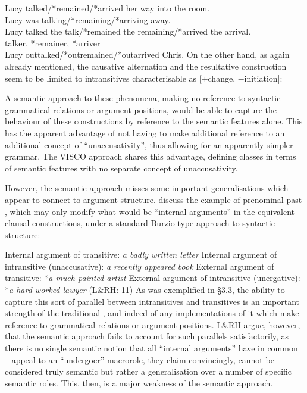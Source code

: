 \documentclass[output=paper]{langsci/langscibook}
\begin{document}
\ea
    \ea Lucy talked/*remained/*arrived her way into the room.\\
    \ex Lucy was talking/*remaining/*arriving away.\\
    \ex Lucy talked the talk/*remained the remaining/*arrived the arrival.\\
    \ex talker, *remainer, *arriver\\
    \ex Lucy outtalked/*outremained/*outarrived Chris.
    \z
\z
On the other hand, as again already mentioned, the causative alternation and
the resultative construction seem to be limited to intransitives
characterisable as [$+$change, $-$initiation]:

\ea
    \z
\z

\ea
    \z
\z
A semantic approach to these phenomena, making no reference to syntactic
grammatical relations or argument positions, would be able to capture the
behaviour of these constructions by reference to the semantic features alone.
This has the apparent advantage of not having to make additional reference to
an additional concept of \enquote{unaccusativity}, thus allowing for an
apparently simpler grammar. The VISCO approach shares this advantage, defining
classes in terms of semantic features with no separate concept of
unaccusativity.

However, the semantic approach misses some important generalisations which
appear to connect  to argument structure.
\textcite[11--12]{LevinRappaportHovav1995} discuss the example of prenominal
past , which may only modify what would be \enquote{internal
arguments} in the equivalent clausal constructions, under a standard
Burzio-type approach to syntactic structure:

\ea
    \ea Internal argument of transitive: \emph{a badly written letter}
    \ex Internal argument of intransitive (unaccusative): \emph{a recently appeared book}
    \ex External argument of transitive: *\emph{a much-painted artist}
    \ex External argument of intransitive (unergative): *\emph{a hard-worked lawyer} (L\&RH: 11)
    \z
\z
As was exemplified in §3.3, the ability to capture this sort of parallel
between intransitives and transitives is an important strength of the
traditional , and indeed of any implementations of it
which make reference to grammatical relations or argument positions. L\&RH
argue, however, that the semantic approach fails to account for such parallels
satisfactorily, as there is no single semantic notion that all
\enquote{internal arguments} have in common --  appeal to an
\enquote{undergoer} macrorole, they claim convincingly, cannot be considered
truly semantic but rather a generalisation over a number of specific semantic
roles.  This, then, is a major weakness of the semantic approach.
\end{document}
